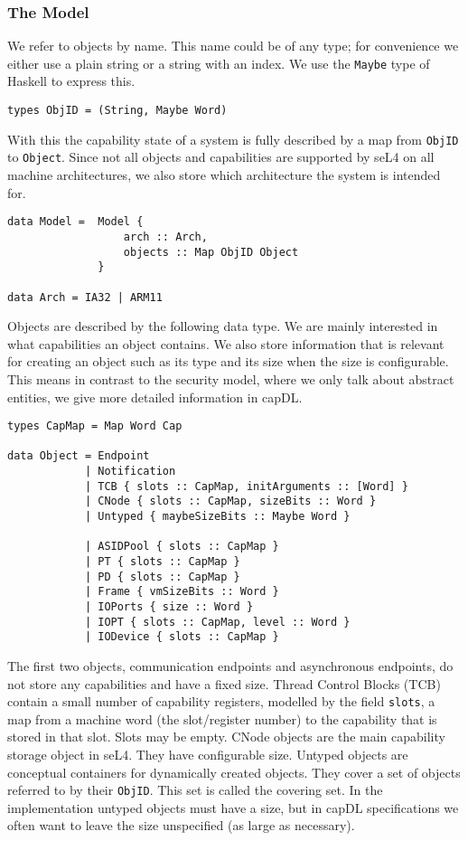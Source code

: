 \documentclass[a4paper,11pt]{article}
\begin{document}
\subsubsection{The Model}
We refer to objects by name. This name could be of any type; for convenience we either use a plain string or a string with an index. We use the \texttt{Maybe} type of Haskell to express this. 

\begin{verbatim}
types ObjID = (String, Maybe Word)
\end{verbatim}

With this the capability state of a system is fully described by a map from \texttt{ObjID} to \texttt{Object}. Since not all objects and capabilities are supported by seL4 on all machine architectures, we also store which architecture the system is intended for.

\begin{verbatim}
data Model =  Model {
                  arch :: Arch,
                  objects :: Map ObjID Object
              } 

data Arch = IA32 | ARM11
\end{verbatim}

Objects are described by the following data type. We are mainly interested in what capabilities an object contains. We also store information that is relevant for creating an object such as its type and its size when the size is configurable. This means in contrast to the security model, where we only talk about abstract entities, we give more detailed information in capDL.

\begin{verbatim}
types CapMap = Map Word Cap

data Object = Endpoint
            | Notification
            | TCB { slots :: CapMap, initArguments :: [Word] }
            | CNode { slots :: CapMap, sizeBits :: Word } 
            | Untyped { maybeSizeBits :: Maybe Word }

            | ASIDPool { slots :: CapMap }
            | PT { slots :: CapMap }
            | PD { slots :: CapMap }
            | Frame { vmSizeBits :: Word }
            | IOPorts { size :: Word }
            | IOPT { slots :: CapMap, level :: Word }
            | IODevice { slots :: CapMap }
\end{verbatim}

The first two objects, communication endpoints and asynchronous endpoints, do not store any capabilities and have a fixed size. Thread Control Blocks (TCB) contain a small number of capability registers, modelled by the field \texttt{slots}, a map from a machine word (the slot/register number) to the capability that is stored in that slot. Slots may be empty. CNode objects are the main capability storage object in seL4. They have configurable size. Untyped objects are conceptual containers for dynamically created objects. They cover a set of objects referred to by their \texttt{ObjID}. This set is called the covering set. In the implementation untyped objects must have a size, but in capDL specifications we often want to leave the size unspecified (as large as necessary). 
\end{document}
